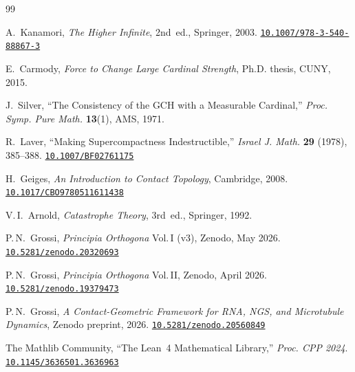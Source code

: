 \documentclass[12pt,a4paper]{amsart}
\newcommand{\doinote}[1]{\href{https://doi.org/#1}{\texttt{#1}}}
\theoremstyle{definition}
\theoremstyle{remark}
\begin{document}

\begin{thebibliography}{99}

A.~Kanamori,
\textit{The Higher Infinite}, 2nd~ed., Springer, 2003.
\doinote{10.1007/978-3-540-88867-3}

E.~Carmody,
\textit{Force to Change Large Cardinal Strength}, Ph.D. thesis, CUNY, 2015.

J.~Silver,
``The Consistency of the GCH with a Measurable Cardinal,''
\textit{Proc. Symp. Pure Math.} \textbf{13}(1), AMS, 1971.

R.~Laver,
``Making Supercompactness Indestructible,''
\textit{Israel J. Math.} \textbf{29} (1978), 385--388.
\doinote{10.1007/BF02761175}

H.~Geiges,
\textit{An Introduction to Contact Topology}, Cambridge, 2008.
\doinote{10.1017/CBO9780511611438}

V.\,I.~Arnold,
\textit{Catastrophe Theory}, 3rd~ed., Springer, 1992.

P.\,N.~Grossi,
\textit{Principia Orthogona} Vol.\,I (v3), Zenodo, May 2026.
\doinote{10.5281/zenodo.20320693}

P.\,N.~Grossi,
\textit{Principia Orthogona} Vol.\,II, Zenodo, April 2026.
\doinote{10.5281/zenodo.19379473}

P.\,N.~Grossi,
\textit{A Contact-Geometric Framework for RNA, NGS, and Microtubule Dynamics},
Zenodo preprint, 2026.
\doinote{10.5281/zenodo.20560849}

The Mathlib Community,
``The Lean~4 Mathematical Library,''
\textit{Proc. CPP 2024}.
\doinote{10.1145/3636501.3636963}

\end{thebibliography}
\end{document}
